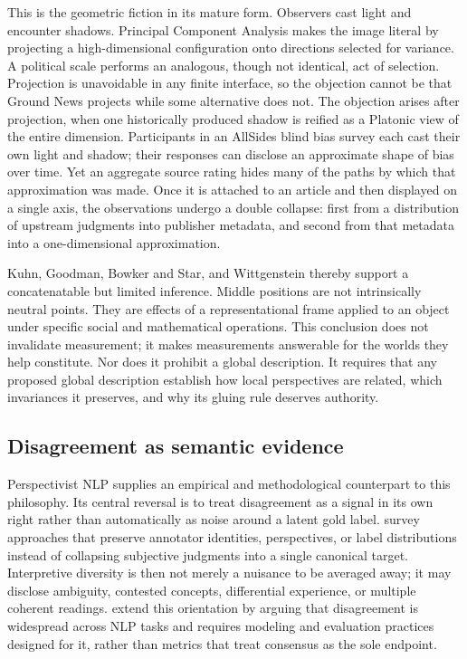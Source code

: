 This is the geometric fiction in its mature form. Observers cast light and encounter shadows. Principal Component Analysis makes the image literal by projecting a high-dimensional configuration onto directions selected for variance. A political scale performs an analogous, though not identical, act of selection. Projection is unavoidable in any finite interface, so the objection cannot be that Ground News projects while some alternative does not. The objection arises after projection, when one historically produced shadow is reified as a Platonic view of the entire dimension. Participants in an AllSides blind bias survey each cast their own light and shadow; their responses can disclose an approximate shape of bias over time. Yet an aggregate source rating hides many of the paths by which that approximation was made. Once it is attached to an article and then displayed on a single axis, the observations undergo a double collapse: first from a distribution of upstream judgments into publisher metadata, and second from that metadata into a one-dimensional approximation.

Kuhn, Goodman, Bowker and Star, and Wittgenstein thereby support a concatenatable but limited inference. Middle positions are not intrinsically neutral points. They are effects of a representational frame applied to an object under specific social and mathematical operations. This conclusion does not invalidate measurement; it makes measurements answerable for the worlds they help constitute. Nor does it prohibit a global description. It requires that any proposed global description establish how local perspectives are related, which invariances it preserves, and why its gluing rule deserves authority.

\subsection{Disagreement as semantic evidence}

Perspectivist NLP supplies an empirical and methodological counterpart to this philosophy. Its central reversal is to treat disagreement as a signal in its own right rather than automatically as noise around a latent gold label. \citet{frenda2024} survey approaches that preserve annotator identities, perspectives, or label distributions instead of collapsing subjective judgments into a single canonical target. Interpretive diversity is then not merely a nuisance to be averaged away; it may disclose ambiguity, contested concepts, differential experience, or multiple coherent readings. \citet{xujurgens2026} extend this orientation by arguing that disagreement is widespread across NLP tasks and requires modeling and evaluation practices designed for it, rather than metrics that treat consensus as the sole endpoint.

